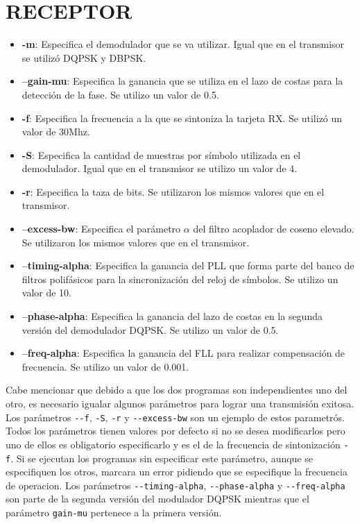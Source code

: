 \section*{RECEPTOR}
\begin{itemize}
  \item \textbf{-m}: Especifica el demodulador que se va utilizar. Igual que en el transmisor se
  utiliz\'o DQPSK y DBPSK.
  \item \textbf{--gain-mu}: Especifica la ganancia que se utiliza en el lazo de costas para la
  detecci\'on de la fase. Se utilizo un valor de 0.5.
  \item \textbf{-f}: Especifica la frecuencia a la que se sintoniza la tarjeta RX. Se utiliz\'o un
  valor de 30Mhz.
  \item \textbf{-S}: Especifica la cantidad de muestras por s\'imbolo utilizada en el demodulador.
  Igual que en el transmisor se utilizo un valor de 4.
  \item \textbf{-r}: Especifica la taza de bits. Se utilizaron los mismos valores que en el
  transmisor.
  \item \textbf{--excess-bw}: Especifica el par\'ametro $\alpha$ del filtro acoplador de coseno
  elevado. Se utilizaron los mismos valores que en el transmisor.
  \item \textbf{--timing-alpha}: Especifica la ganancia del PLL que forma parte del banco de filtros
  polif\'asicos para la sincronizaci\'on del reloj de s\'imbolos. Se utilizo un valor de 10.
  \item \textbf{--phase-alpha}: Especifica la ganancia del lazo de costas en la segunda versi\'on
  del demodulador DQPSK. Se utilizo un valor de 0.5.
  \item \textbf{--freq-alpha}: Especifica la ganancia del FLL para realizar compensaci\'on de
  frecuencia. Se utilizo un valor de 0.001.
\end{itemize}

Cabe mencionar que debido a que los dos programas son independientes uno del otro, es necesario
igualar algunos par\'ametros para lograr una transmisi\'on exitosa. Los par\'ametros \verb|--f|,
\verb|-S|, \verb|-r| y \verb|--excess-bw| son un ejemplo de estos parametr\'os. Todos los
par\'ametros tienen valores por defecto si no se desea modificarlos pero uno de ellos es obligatorio
especificarlo y es el de la frecuencia de sintonizaci\'on \verb|-f|. Si se ejecutan los programas
sin especificar este par\'ametro, aunque se especifiquen los otros, marcara un error pidiendo que
se especifique la frecuencia de operacion. Los par\'ametros \verb|--timing-alpha|,
\verb|--phase-alpha| y \verb|--freq-alpha| son parte de la segunda versi\'on del modulador DQPSK
mientras que el par\'ametro \verb|gain-mu| pertenece a la primera versi\'on. 
